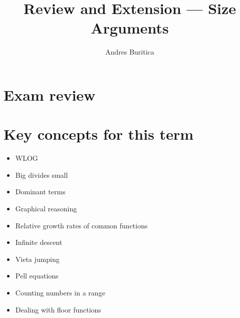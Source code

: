 \documentclass{article}
\title{Review and Extension --- Size Arguments}
\author{Andres Buritica}
\date{}
\begin{document}
\maketitle
\section{Exam review}
\section{Key concepts for this term}
  \begin{itemize}
    \item WLOG
    \item Big divides small
    \item Dominant terms
    \item Graphical reasoning
    \item Relative growth rates of common functions
    \item Infinite descent
    \item Vieta jumping
    \item Pell equations
    \item Counting numbers in a range
    \item Dealing with floor functions
  \end{itemize}
\end{document}
